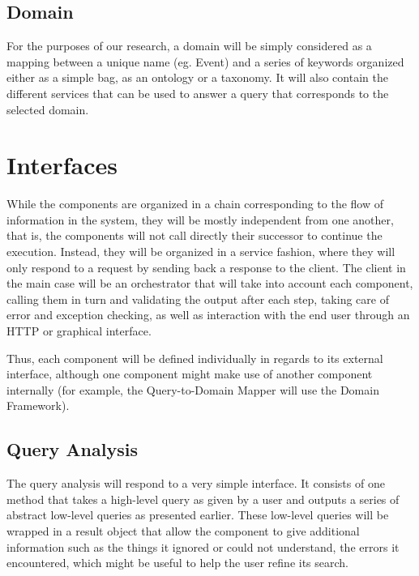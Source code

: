 
\subsection{Domain} %
\label{sub:domain}

For the purposes of our research, a domain will be simply considered as a mapping between a unique name (eg. Event) and a series of keywords organized either as a simple bag, as an ontology or a taxonomy. It will also contain the different services that can be used to answer a query that corresponds to the selected domain.


\section{Interfaces} %
\label{sec:interfaces}

While the components are organized in a chain corresponding to the flow of information in the system, they will be mostly independent from one another, that is, the components will not call directly their successor to continue the execution. Instead, they will be organized in a service fashion, where they will only respond to a request by sending back a response to the client. The client in the main case will be an orchestrator that will take into account each component, calling them in turn and validating the output after each step, taking care of error and exception checking, as well as interaction with the end user through an HTTP or graphical interface.

Thus, each component will be defined individually in regards to its external interface, although one component might make use of another component internally (for example, the Query-to-Domain Mapper will use the Domain Framework).

\subsection{Query Analysis} %
\label{sub:query_analysis_dm}

The query analysis will respond to a very simple interface. It consists of one method that takes a high-level query as given by a user and outputs a series of abstract low-level queries as presented earlier. These low-level queries will be wrapped in a result object that allow the component to give additional information such as the things it ignored or could not understand, the errors it encountered, which might be useful to help the user refine its search.

